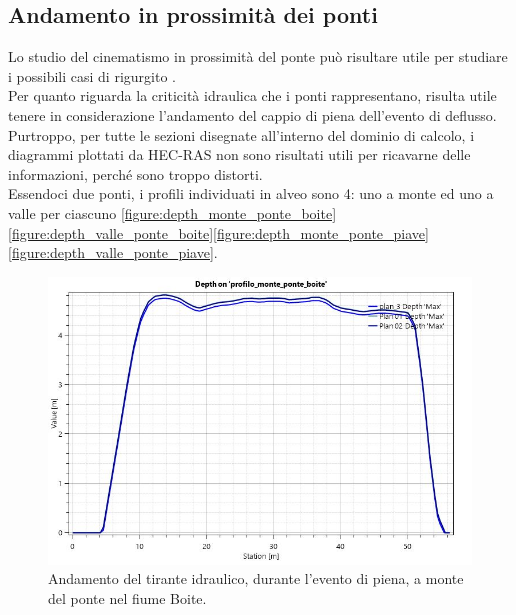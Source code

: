 \subsection{Andamento in prossimità dei ponti}
Lo studio del cinematismo in prossimità del ponte può risultare utile per studiare i possibili casi di rigurgito \cite{rigurgito}.\\
Per quanto riguarda la criticità idraulica che i ponti rappresentano, risulta utile tenere in considerazione l'andamento del cappio di piena dell'evento di deflusso. Purtroppo, per tutte le sezioni disegnate all'interno del dominio di calcolo, i diagrammi plottati da HEC-RAS non sono risultati utili per ricavarne delle informazioni, perché sono troppo distorti.\\
Essendoci due ponti, i profili individuati in alveo sono 4: uno a monte ed uno a valle per ciascuno \eqref{figure:depth_monte_ponte_boite}\eqref{figure:depth_valle_ponte_boite}\eqref{figure:depth_monte_ponte_piave}\eqref{figure:depth_valle_ponte_piave}.

\begin{figure}[H] \centering
    \includegraphics[scale=0.5]{immagini/depth_monte_ponte_boite.JPG}
    \caption{Andamento del tirante idraulico, durante l'evento di piena, a monte del ponte nel fiume Boite.}
    \label{figure:depth_monte_ponte_boite}
\end{figure}

